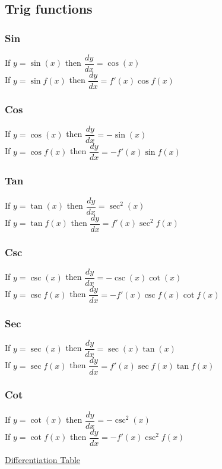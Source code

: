 \documentclass{article}[18pt]
\begin{document}
\subsection{Trig functions}
\subsubsection{Sin}
If $y=\sin(x)$ then $\dfrac{dy}{dx}=\cos(x)$\\
If $y=\sin f(x)$ then $\dfrac{dy}{dx}=f'(x)\cos f(x)$
\subsubsection{Cos}
If $y=\cos(x)$ then $\dfrac{dy}{dx}=-\sin(x)$\\
If $y=\cos f(x)$ then $\dfrac{dy}{dx}=-f'(x)\sin f(x)$\\
\subsubsection{Tan}
If $y=\tan(x)$ then $\dfrac{dy}{dx}=\sec^2(x)$\\
If $y=\tan f(x)$ then $\dfrac{dy}{dx}=f'(x)\sec^2f(x)$\\
\subsubsection{Csc}
If $y=\csc(x)$ then $\dfrac{dy}{dx}=-\csc(x)\cot(x)$\\
If $y=\csc f(x)$ then $\dfrac{dy}{dx}=-f'(x)\csc f(x)\cot f(x)$\\
\subsubsection{Sec}
If $y=\sec(x)$ then $\dfrac{dy}{dx}=\sec(x)\tan(x)$\\
If $y=\sec f(x)$ then $\dfrac{dy}{dx}=f'(x)\sec f(x)\tan f(x)$\\
\subsubsection{Cot}
If $y=\cot(x)$ then $\dfrac{dy}{dx}=-\csc^2(x)$\\
If $y=\cot f(x)$ then $\dfrac{dy}{dx}=-f'(x)\csc^2f(x)$\\
\newpage
\begin{center}
\underline{\huge Differentiation Table}
\end{center}
\end{document}
